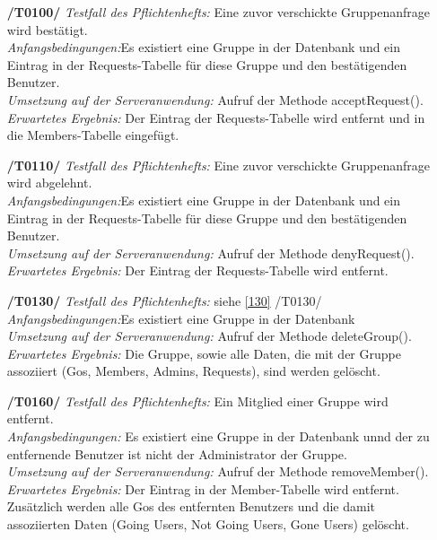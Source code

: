 \documentclass[11pt,a4paper]{scrartcl}
\begin{document}
\begin{enumerate}
	\item[\textbf{/T0100/}]
	\textit{Testfall des Pflichtenhefts: }Eine zuvor verschickte Gruppenanfrage wird bestätigt.\\
	\textit{Anfangsbedingungen:}Es existiert eine Gruppe in der Datenbank und ein Eintrag in der Requests-Tabelle für diese Gruppe und den bestätigenden Benutzer.\\
	\textit{Umsetzung auf der Serveranwendung: }Aufruf der Methode acceptRequest().\\
	\textit{Erwartetes Ergebnis: }Der Eintrag der Requests-Tabelle wird entfernt und in die Members-Tabelle eingefügt.
	
	\item[\textbf{/T0110/}]
	\textit{Testfall des Pflichtenhefts: }Eine zuvor verschickte Gruppenanfrage wird abgelehnt.\\
	\textit{Anfangsbedingungen:}Es existiert eine Gruppe in der Datenbank und ein Eintrag in der Requests-Tabelle für diese Gruppe und den bestätigenden Benutzer.\\
	\textit{Umsetzung auf der Serveranwendung: }Aufruf der Methode denyRequest().\\
	\textit{Erwartetes Ergebnis: }Der Eintrag der Requests-Tabelle wird entfernt.
	
	\item[\textbf{/T0130/}] \label{T130} 
	\textit{Testfall des Pflichtenhefts: }siehe \ref{130} /T0130/\\
	\textit{Anfangsbedingungen:}Es existiert eine Gruppe in der Datenbank\\
	\textit{Umsetzung auf der Serveranwendung: }Aufruf der Methode deleteGroup().\\
	\textit{Erwartetes Ergebnis: }Die Gruppe, sowie alle Daten, die mit der Gruppe assoziiert (Gos, Members, Admins, Requests), sind werden gelöscht.
	
	\item[\textbf{/T0160/}]
	\textit{Testfall des Pflichtenhefts: }Ein Mitglied einer Gruppe wird entfernt.\\
	\textit{Anfangsbedingungen: }Es existiert eine Gruppe in der Datenbank unnd der zu entfernende Benutzer ist nicht der Administrator der Gruppe.\\
	\textit{Umsetzung auf der Serveranwendung: }Aufruf der Methode removeMember().\\
	\textit{Erwartetes Ergebnis: }Der Eintrag in der Member-Tabelle wird entfernt. Zusätzlich werden alle Gos des entfernten Benutzers und die damit assoziierten Daten (Going Users, Not Going Users, Gone Users) gelöscht.
	

\end{enumerate}
\end{document}

